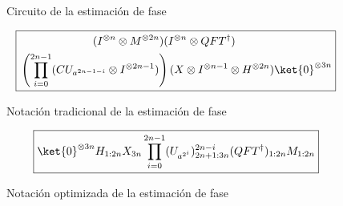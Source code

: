 \documentclass[10pt,conference,a4paper]{IEEEtran}
\begin{document}
\begin{figure}[htb!]
\begin{center}
    \caption{Circuito de la estimación de fase} \label{fig:shor}
\end{center}
\end{figure}

\begin{figure}[htb!]
\begin{equation*}
    \boxed{
    \begin{aligned}
            &\hspace{23mm}(I^{\otimes n}\otimes M^{\otimes 2n})(I^{\otimes n}\otimes QFT^{\dagger})\\
            &\left(\displaystyle\prod_{i=0}^{2n-1}(CU_{a^{2n-1-i}}\otimes I^{\otimes 2n-1})\right)(X\otimes I^{\otimes n-1}\otimes H^{\otimes 2n})\ket{0}^{\otimes 3n}
    \end{aligned}}
\end{equation*}
\caption{Notación tradicional  de la estimación de fase}
        \label{Fig10} 
\end{figure}

\begin{figure}[htb!]
$$\boxed{\ket{0}^{\otimes 3n}H_{1:2n}X_{3n}\displaystyle\prod_{i=0}^{2n-1}(U_{a^{2^i}})_{2n+1:3n}^{2n-i}(QFT^{\dagger})_{1:2n}M_{1:2n}}$$
\caption{Notación optimizada de la estimación de fase}
        \label{Fig11} 
\end{figure}
\end{document}
